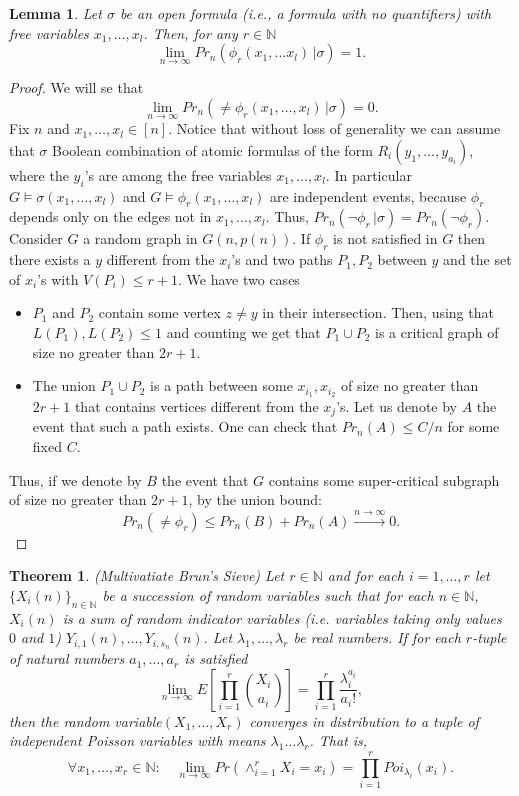\documentclass[11pt,notitlepage]{report}
\newtheorem{theorem}{Theorem}[chapter]
\newtheorem{lemma}{Lemma}[chapter]
\theoremstyle{definition}
\newcommand{\N}{\mathbb{N}}
\newcommand{\Ln}{\lim\limits_{n\to \infty}}
\begin{document}
\begin{lemma} \label{lem:faraway}
	Let $\sigma$ be an open formula (i.e., a formula with no quantifiers)
	with free variables $x_1, \dots, x_l$. Then, for any $r\in \N$
	\[ \Ln Pr_n(\phi_r(x_1, \dots x_l) \, | \sigma ) =1 .\]
\end{lemma}
\begin{proof}
	We will se that
	\[ \Ln Pr_n(\neq \phi_r(x_1, \dots, x_l) \, | \sigma ) =0.\]
	Fix $n$ and $x_1,\dots, x_l \in [n]$.
    Notice that without loss of generality we can
	assume that $\sigma$ Boolean combination of atomic
	formulas of the form $R_i(y_1,\dots,y_{a_i})$, where the $y_i$'s
	are among the free variables $x_1,\dots, x_l$.
	In particular $G\models \sigma(x_1, \dots, x_l)$ and 
	$G\models \phi_r(x_1,\dots, x_l)$
	are independent events, because $\phi_r$ depends
	only on the edges not in $x_1,\dots, x_l$.
	Thus, $Pr_n(\neg \phi_r \, | \sigma)= Pr_n(\neg \phi_r)$.
	Consider $G$ a random graph in $G(n,p(n))$. 
	If $\phi_r$ is not satisfied in $G$ then 
	there exists a $y$ different from the $x_i$'s
	and two paths $P_1,P_2$ between $y$ and the set 
	of $x_i$'s with $V(P_i)\leq r+1$. We have two cases
	\begin{itemize}[leftmargin=*]
		\item $P_1$ and $P_2$ contain some vertex $z\neq y$
		in their intersection. Then, using that
		$L(P_1), L(P_2)\leq 1$ and counting we get that
		$P_1\cup P_2$ is a critical graph of size no greater
		than $2r+1$.
		\item The union $P_1\cup P_2$ is a path
		between some $x_{i_1}, x_{i_2}$ of size no greater
		than $2r+1$ that contains vertices different
		from the $x_j$'s. Let us denote by $A$ the event that
		such a path exists. One can check that $Pr_n(A)\leq C/n$
		for some fixed $C$.   	
	\end{itemize}
	Thus, if we denote by $B$ the event that $G$ contains some 
	super-critical subgraph of size no greater than $2r+1$,  by the
	union bound:
	\[ Pr_n(\neq \phi_r)\leq  Pr_n(B)+ Pr_n(A) 
	\stackrel{n\to \infty}{\longrightarrow}	0.\]
\end{proof}

\begin{theorem}{(Multivatiate Brun's Sieve)}
	Let $r\in \N$ and for each $i=1,\dots, r$  let
	$\{X_i(n)\}_{n\in \N}$ be a succession of random variables 
	such that for each $n\in \N$, $X_i(n)$ 
	is a sum of random indicator variables (i.e. variables 
	taking only values $0$ and $1$)
	$Y_{i,1}(n),\dots, Y_{i,s_n}(n)$. Let $\lambda_1, \dots ,
	\lambda_r$ be real numbers. If for each 
	$r$-tuple of natural numbers $a_1,\dots, a_r$
	is satisfied
	\[ \Ln E\left[\prod_{i=1}^r \binom{X_i}{a_i} \right] = 
	\prod_{i=1}^r \frac{\lambda_i^{a_i}}{a_i!}, \]
	then the random variable$(X_1,\dots ,X_r)$ converges in distribution
	to a tuple of independent Poisson variables with means $\lambda_1
	\dots \lambda_r$. That is,	
	\[ \forall x_1,\dots, x_r\in \N: \quad \Ln Pr(\wedge_{i=1}^r
	 X_i=x_i)= \prod_{i=1}^r Poi_{\lambda_i}(x_i).\]

\end{theorem}
\end{document}
